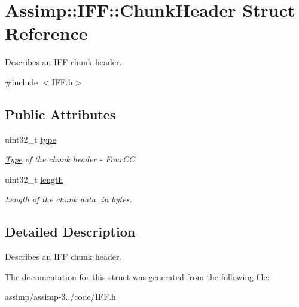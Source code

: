 \hypertarget{struct_assimp_1_1_i_f_f_1_1_chunk_header}{\section{Assimp\+:\+:I\+F\+F\+:\+:Chunk\+Header Struct Reference}
\label{struct_assimp_1_1_i_f_f_1_1_chunk_header}
}


Describes an I\+F\+F chunk header.  




{\ttfamily \#include $<$I\+F\+F.\+h$>$}

\subsection*{Public Attributes}
\begin{DoxyCompactItemize}
\item 
\hypertarget{struct_assimp_1_1_i_f_f_1_1_chunk_header_a917f44ef80c67c5998bb0362b3ffbfe0}{uint32\+\_\+t \hyperlink{struct_assimp_1_1_i_f_f_1_1_chunk_header_a917f44ef80c67c5998bb0362b3ffbfe0}{type}}\label{struct_assimp_1_1_i_f_f_1_1_chunk_header_a917f44ef80c67c5998bb0362b3ffbfe0}

\begin{DoxyCompactList}\small\item\em \hyperlink{struct_type}{Type} of the chunk header -\/ Four\+C\+C. \end{DoxyCompactList}\item 
\hypertarget{struct_assimp_1_1_i_f_f_1_1_chunk_header_a404662e9362aca72439e248d6949f3ab}{uint32\+\_\+t \hyperlink{struct_assimp_1_1_i_f_f_1_1_chunk_header_a404662e9362aca72439e248d6949f3ab}{length}}\label{struct_assimp_1_1_i_f_f_1_1_chunk_header_a404662e9362aca72439e248d6949f3ab}

\begin{DoxyCompactList}\small\item\em Length of the chunk data, in bytes. \end{DoxyCompactList}\end{DoxyCompactItemize}


\subsection{Detailed Description}
Describes an I\+F\+F chunk header. 

The documentation for this struct was generated from the following file\+:\begin{DoxyCompactItemize}
\item 
assimp/assimp-\/3../code/I\+F\+F.\+h\end{DoxyCompactItemize}
